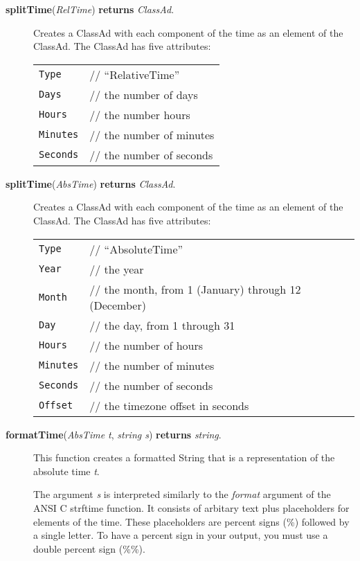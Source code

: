\documentclass{article}
\begin{document}
\begin{description}
\item[\textbf{splitTime}(\emph{RelTime}) \textbf{returns} \emph{ClassAd}.]

Creates a ClassAd with each component of the time as an element of the
ClassAd. The ClassAd has five attributes:

\begin{tabular}{ll}
\verb/Type/     & // ``RelativeTime''      \\
\verb/Days/     & // the number of days    \\
\verb/Hours/    & // the number hours      \\
\verb/Minutes/  & // the number of minutes \\
\verb/Seconds/  & // the number of seconds \\
\end{tabular}

\item[\textbf{splitTime}(\emph{AbsTime}) \textbf{returns} \emph{ClassAd}.]

Creates a ClassAd with each component of the time as an element of the
ClassAd. The ClassAd has five attributes:

\begin{tabular}{ll}
\verb/Type/     & // ``AbsoluteTime''      \\
\verb/Year/     & // the year              \\
\verb/Month/    & // the month, from 1 (January) through 12 (December) \\
\verb/Day/      & // the day, from 1 through 31 \\
\verb/Hours/    & // the number of hours   \\
\verb/Minutes/  & // the number of minutes \\
\verb/Seconds/  & // the number of seconds \\
\verb/Offset/   & // the timezone offset in seconds   \\
\end{tabular}

\item[\textbf{formatTime}(\emph{AbsTime t}, \emph{string s})
\textbf{returns} \emph{string}.]

This function creates a formatted String that is a representation of
the absolute time \emph{t}. 

The argument \emph{s} is interpreted similarly to the \emph{format} argument of
the ANSI C strftime function. It consists of arbitary text plus placeholders
for elements of the time. These placeholders are percent signs (\%) followed by
a single letter. To have a percent sign in your output, you must use a double
percent sign (\%\%). 


\end{description}
\end{document}
